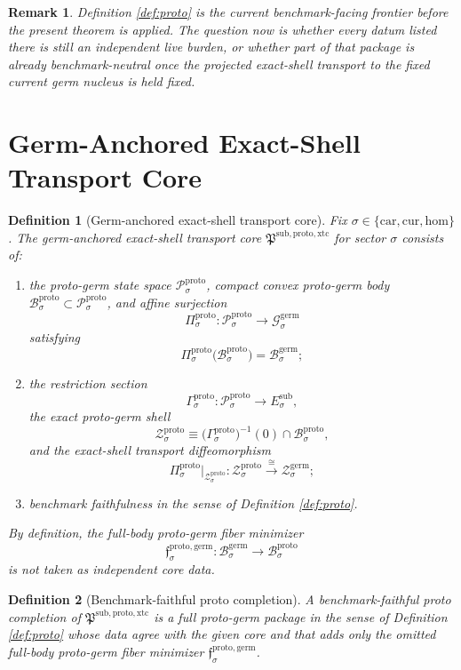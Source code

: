 \documentclass[11pt]{article}
\newcommand{\Car}{\mathrm{car}}
\newcommand{\Cur}{\mathrm{cur}}
\newcommand{\Hom}{\mathrm{hom}}
\newcommand{\SubTarget}[1]{E_{#1}^{\mathrm{sub}}}
\newcommand{\GermState}[1]{\mathcal G_{#1}^{\mathrm{germ}}}
\newcommand{\GermBody}[1]{\mathcal B_{#1}^{\mathrm{germ}}}
\newcommand{\GermShell}[1]{\mathcal Z_{#1}^{\mathrm{germ}}}
\newcommand{\ProtoTransportCore}{\mathfrak P^{\mathrm{sub,proto,xtc}}}
\newcommand{\ProtoState}[1]{\mathcal P_{#1}^{\mathrm{proto}}}
\newcommand{\ProtoBody}[1]{\mathcal B_{#1}^{\mathrm{proto}}}
\newcommand{\ProtoProj}[1]{\Pi_{#1}^{\mathrm{proto}}}
\newcommand{\ProtoGermMin}[1]{\mathfrak f_{#1}^{\mathrm{proto,germ}}}
\newcommand{\ProtoSection}[1]{\Gamma_{#1}^{\mathrm{proto}}}
\newcommand{\ProtoShell}[1]{\mathcal Z_{#1}^{\mathrm{proto}}}
\newtheorem{definition}{Definition}
\newtheorem{remark}{Remark}
\begin{document}
\begin{remark}
Definition \ref{def:proto} is the current benchmark-facing frontier before the present theorem is applied. The question now is whether every datum listed there is still an independent live burden, or whether part of that package is already benchmark-neutral once the projected exact-shell transport to the fixed current germ nucleus is held fixed.
\end{remark}

\section{Germ-Anchored Exact-Shell Transport Core}

\begin{definition}[Germ-anchored exact-shell transport core]
\label{def:core}
Fix \(\sigma\in\{\Car,\Cur,\Hom\}\). The \emph{germ-anchored exact-shell transport core} \(\ProtoTransportCore\) for sector \(\sigma\) consists of:
\begin{enumerate}
    \item the proto-germ state space \(\ProtoState{\sigma}\), compact convex proto-germ body \(\ProtoBody{\sigma}\subset\ProtoState{\sigma}\), and affine surjection
    \[
    \ProtoProj{\sigma}:\ProtoState{\sigma}\to\GermState{\sigma}
    \]
    satisfying
    \[
    \ProtoProj{\sigma}\bigl(\ProtoBody{\sigma}\bigr)=\GermBody{\sigma};
    \]
    \item the restriction section
    \[
    \ProtoSection{\sigma}:\ProtoState{\sigma}\to\SubTarget{\sigma},
    \]
    the exact proto-germ shell
    \[
    \ProtoShell{\sigma}
    \equiv
    \bigl(\ProtoSection{\sigma}\bigr)^{-1}(0)\cap\ProtoBody{\sigma},
    \]
    and the exact-shell transport diffeomorphism
    \[
    \ProtoProj{\sigma}\big|_{\ProtoShell{\sigma}}
    :
    \ProtoShell{\sigma}
    \xrightarrow{\cong}
    \GermShell{\sigma};
    \]
    \item benchmark faithfulness in the sense of Definition \ref{def:proto}.
\end{enumerate}
By definition, the full-body proto-germ fiber minimizer
\[
\ProtoGermMin{\sigma}:\GermBody{\sigma}\to\ProtoBody{\sigma}
\]
is \emph{not} taken as independent core data.
\end{definition}

\begin{definition}[Benchmark-faithful proto completion]
\label{def:completion}
A \emph{benchmark-faithful proto completion} of \(\ProtoTransportCore\) is a full proto-germ package in the sense of Definition \ref{def:proto} whose data agree with the given core and that adds only the omitted full-body proto-germ fiber minimizer \(\ProtoGermMin{\sigma}\).
\end{definition}
\end{document}
